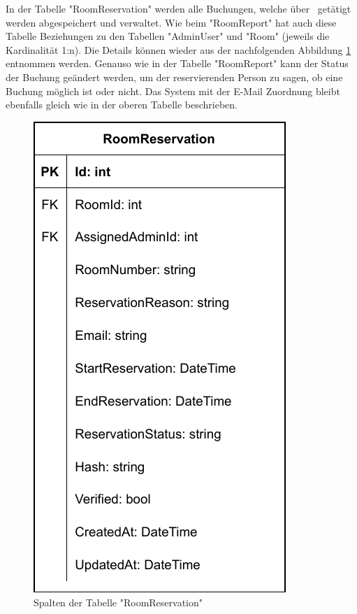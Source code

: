 \pagebreak


In der Tabelle "RoomReservation" werden alle Buchungen, welche über \ZELIA\ getätigt werden abgespeichert und verwaltet. Wie beim "RoomReport" hat auch diese Tabelle Beziehungen zu den Tabellen "AdminUser" und "Room" (jeweils die Kardinalität 1:n). Die Details können wieder aus der nachfolgenden Abbildung \ref{fig:RoomReservationColls} entnommen werden. Genauso wie in der Tabelle "RoomReport" kann der Status der Buchung geändert werden, um der reservierenden Person zu sagen, ob eine Buchung möglich ist oder nicht. Das System mit der E-Mail Zuordnung bleibt ebenfalls gleich wie in der oberen Tabelle beschrieben.

\begin{figure}[H]
    \centering
    \includegraphics{media/MariaDB/RoomReservation.svg.pdf}
    \caption{Spalten der Tabelle "RoomReservation"}
    \label{fig:RoomReservationColls}
\end{figure}

